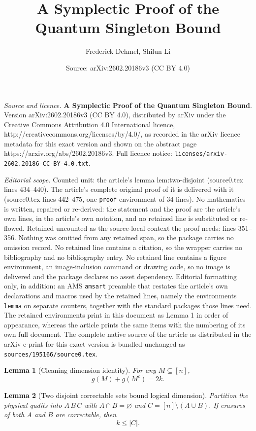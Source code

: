 \documentclass[10pt,a4paper]{amsart}
\title{\textbf{A Symplectic Proof of the Quantum Singleton Bound}}
\author{Frederick Dehmel, Shilun Li}
\date{Source: arXiv:2602.20186v3 (CC BY 4.0)}
\newtheorem{lemma}{Lemma}
\begin{document}
\maketitle

\noindent\emph{Source and licence.} \textbf{A Symplectic Proof of the Quantum Singleton Bound}. Version arXiv:2602.20186v3 (CC BY 4.0), distributed by arXiv under the Creative Commons Attribution 4.0 International licence, http://creativecommons.org/licenses/by/4.0/, as recorded in the arXiv licence metadata for this exact version and shown on the abstract page https://arxiv.org/abs/2602.20186v3. Full licence notice: \texttt{licenses/arxiv-2602.20186-CC-BY-4.0.txt}.\par\smallskip

\noindent\textit{Editorial scope.} Counted unit: the article's lemma lem:two-disjoint (source0.tex lines 434--440). The article's complete original proof of it is delivered with it (source0.tex lines 442--475, one \texttt{proof} environment of 34 lines). No mathematics is written, repaired or re-derived: the statement and the proof are the article's own lines, in the article's own notation, and no retained line is substituted or re-flowed.  Retained uncounted as the source-local context the proof needs: lines 351--356.  Nothing was omitted from any retained span, so the package carries no omission record.  No retained line contains a citation, so the wrapper carries no bibliography and no bibliography entry.  No retained line contains a figure environment, an image-inclusion command or drawing code, so no image is delivered and the package declares no asset dependency.  Editorial formatting only, in addition: an AMS \texttt{amsart} preamble that restates the article's own declarations and macros used by the retained lines, namely the environments \texttt{lemma} on separate counters, together with the standard packages those lines need.  The retained environments print in this document as Lemma 1 in order of appearance, whereas the article prints the same items with the numbering of its own full document.  The complete native source of the article as distributed in the arXiv e-print for this exact version is bundled unchanged as \texttt{sources/195166/source0.tex}.
\begin{lemma}[Cleaning dimension identity]\label{lem:cleaning}
For any $M \subseteq [n]$,
\[
  g(M) + g(M^c) = 2k.
\]
\end{lemma}

\begin{lemma}[Two disjoint correctable sets bound logical dimension]\label{lem:two-disjoint}
Partition the physical qudits into $A\, B\, C$ with $A \cap B = \varnothing$ and
$C = [n] \setminus (A \cup B)$.  If erasures of both $A$ and $B$ are correctable, then
\[
  k \le |C|.
\]
\end{lemma}
\end{document}
